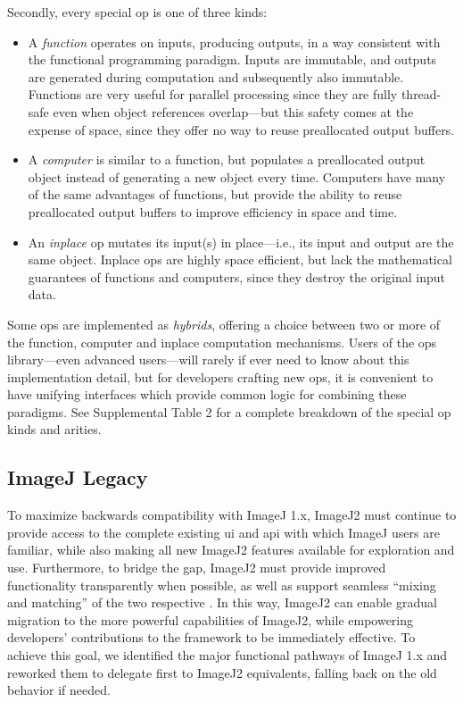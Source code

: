 \documentclass{bmcart}
\begin{document}
Secondly, every special op is one of three kinds:

\begin{itemize}
  \item A \textit{function} operates on inputs, producing outputs, in a way
    consistent with the functional programming paradigm. Inputs are immutable,
    and outputs are generated during computation and subsequently also
    immutable. Functions are very useful for parallel processing since they are
    fully thread-safe even when object references overlap---but this safety
    comes at the expense of space, since they offer no way to reuse
    preallocated output buffers.
  \item A \textit{computer} is similar to a function, but populates a
    preallocated output object instead of generating a new object every time.
    Computers have many of the same advantages of functions, but provide the
    ability to reuse preallocated output buffers to improve efficiency in space
    and time.
  \item An \textit{inplace} op mutates its input(s) in place---i.e., its input
    and output are the same object. Inplace ops are highly space efficient, but
    lack the mathematical guarantees of functions and computers, since they
    destroy the original input data.
\end{itemize}

Some ops are implemented as \textit{hybrids}, offering a choice between two or
more of the function, computer and inplace computation mechanisms. Users of the
ops library---even advanced users---will rarely if ever need to know about this
implementation detail, but for developers crafting new ops, it is convenient to
have unifying interfaces which provide common logic for combining these
paradigms. See Supplemental Table 2 for a complete breakdown of the special op
kinds and arities.

\subsection*{ImageJ Legacy}
To maximize backwards compatibility with ImageJ 1.x, ImageJ2 must continue to
provide access to the complete existing \acrshort{ui} and \acrshort{api} with
which ImageJ users are familiar, while also making all new ImageJ2 features
available for exploration and use. Furthermore, to bridge the gap, ImageJ2 must
provide improved functionality transparently when possible, as well as support
seamless ``mixing and matching'' of the two respective . In
this way, ImageJ2 can enable gradual migration to the more powerful
capabilities of ImageJ2, while empowering developers' contributions to the
framework to be immediately effective. To achieve this goal, we identified the
major functional pathways of ImageJ 1.x and reworked them to delegate first to
ImageJ2 equivalents, falling back on the old behavior if needed.
\end{document}
